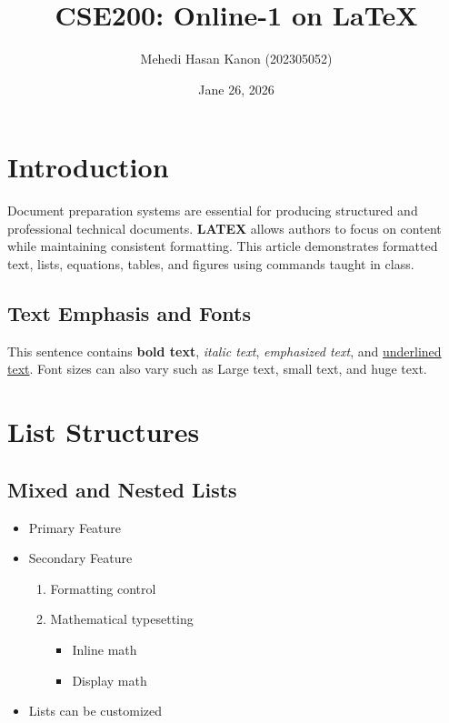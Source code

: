 \documentclass{article}
\begin{document}
\title{CSE200: Online-1 on \LaTeX}

\author{Mehedi Hasan Kanon (202305052)}

\date{Jane 26, 2026}

\maketitle

\section{Introduction}
Document preparation systems are essential for producing structured and professional technical documents. \textbf{LATEX} allows authors to focus on content while maintaining consistent formatting. This article demonstrates formatted text, lists, equations, tables, and figures using commands taught in class.

\subsection{Text Emphasis and Fonts}
This sentence contains \textbf{bold text}, \textit{italic text}, \emph{emphasized text}, and \underline{underlined text}. Font sizes can also vary such as {\large Large text}, {\small small text}, and {\huge huge text}.


\section{List Structures}

\subsection{Mixed and Nested Lists}

\begin{itemize}
    \item Primary Feature
    \item Secondary Feature
    \begin{enumerate}
        \item Formatting control
        \item Mathematical typesetting
        \begin{itemize}
            \item[--] Inline math
            \item[--] Display math 
        \end{itemize}
    \end{enumerate}
    \item[\textbf{Note}] Lists can be customized
\end{itemize}
\end{document}
